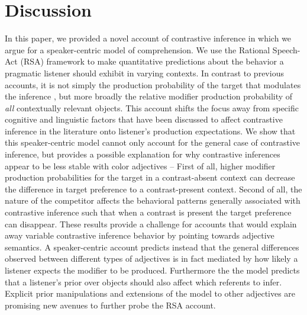 \documentclass[10pt,letterpaper]{article}
\begin{document}
\section{Discussion}

In this paper, we provided a novel account of contrastive inference in which we argue for a speaker-centric model of comprehension. We use the Rational Speech-Act (RSA) framework to make quantitative predictions about the behavior a pragmatic listener should exhibit in varying contexts. In contrast to previous accounts, it is not simply the production probability of the target that modulates the inference \cite<as suggested by the default description account>{Sedivy:2003}, but more broadly the relative modifier production probability of \emph{all} contextually relevant objects. This account shifts the focus away from specific cognitive and linguistic factors that have been discussed to affect contrastive inference in the literature onto listener's production expectations. We show that this speaker-centric model cannot only account for the general case of contrastive inference, but provides a possible explanation for why contrastive inferences appear to be less stable with color adjectives -- First of all, higher modifier production probabilities for the target in a contrast-absent context can decrease the difference in target preference to a contrast-present context. Second of all, the nature of the competitor affects the behavioral patterns generally associated with contrastive inference such that when a contrast is present the target preference can disappear. These results provide a challenge for accounts that would explain away variable contrastive inference behavior by pointing towards adjective semantics. A speaker-centric account predicts instead that the general differences observed between different types of adjectives is in fact mediated by how likely a listener expects the modifier to be produced. Furthermore the the model predicts that a listener's prior over objects should also affect which referents to infer. Explicit prior manipulations and extensions of the model to other adjectives are promising new avenues to further probe the RSA account.
\end{document}
